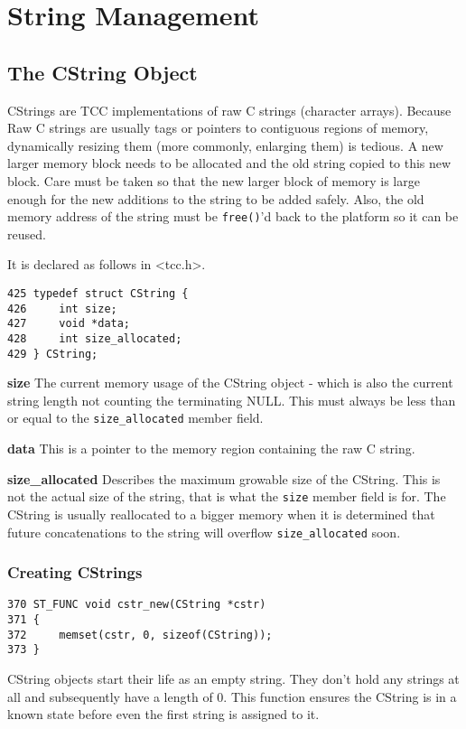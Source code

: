 \chapter{String Management}


\section{The CString Object}

CStrings are TCC implementations of raw C strings (character arrays). Because 
Raw C strings are usually tags or pointers to contiguous regions of memory,
dynamically resizing them (more commonly, enlarging them) is tedious. A new
larger memory block needs to be allocated and the old string copied to this new
block. Care must be taken so that the new larger block of memory is large enough
for the new additions to the string to be added safely. Also, the old memory
address of the string must be \verb|free()|'d back to the platform so it can be reused.

It is declared as follows in <tcc.h>.
\begin{verbatim}
425 typedef struct CString {
426     int size;
427     void *data;
428     int size_allocated;
429 } CString;
\end{verbatim}

\begin{tcc_desc}
\textbf{size} The current memory usage of the CString object - which is also the current string length not counting the terminating NULL. This must always be less than or equal to the \verb|size_allocated| member field.

\textbf{data} This is a pointer to the memory region containing the raw C string.

\textbf{size\_allocated} Describes the maximum growable size of the CString. This is not the actual size of the string, that is what the \verb|size| member field is for. The CString is usually reallocated to a bigger memory when it is determined that future concatenations to the string will overflow \verb|size_allocated| soon.
\end{tcc_desc}

\subsection{Creating CStrings}

\begin{verbatim}
370 ST_FUNC void cstr_new(CString *cstr)
371 {
372     memset(cstr, 0, sizeof(CString));
373 }
\end{verbatim}
CString objects start their life as an empty string. They don't hold any strings at all and subsequently have a length of 0. This function ensures the CString is in a known state before even the first string is assigned to it.

